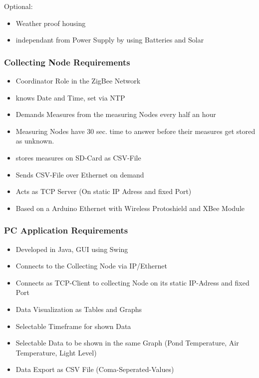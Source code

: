 \documentclass[
	11pt,
	a4paper
]{article}%
\begin{document}
Optional:
\begin{itemize}
\item Weather proof housing
\item independant from Power Supply by using Batteries and Solar
\end{itemize}

\subsubsection{Collecting Node Requirements}
\begin{itemize}
\item Coordinator Role in the ZigBee Network
\item knows Date and Time, set via NTP
\item Demands Measures from the measuring Nodes every half an hour
\item Measuring Nodes have 30 sec. time to answer before their measures get stored as unknown.
\item stores measures on SD-Card as CSV-File
\item Sends CSV-File over Ethernet on demand
\item Acts as TCP Server (On static IP Adress and fixed Port)
\item Based on a Arduino Ethernet with Wireless Protoshield and XBee Module
\end{itemize}

\subsubsection{PC Application Requirements}
\begin{itemize}
\item Developed in Java, GUI using Swing
\item Connects to the Collecting Node via IP/Ethernet
\item Connects as TCP-Client to collecting Node on its static IP-Adress and fixed Port
\item Data Visualization as Tables and Graphs
\item Selectable Timeframe for shown Data
\item Selectable Data to be shown in the same Graph (Pond Temperature, Air Temperature, Light Level)
\item Data Export as CSV File (Coma-Seperated-Values)
\end{itemize}

\newpage
\end{document}
